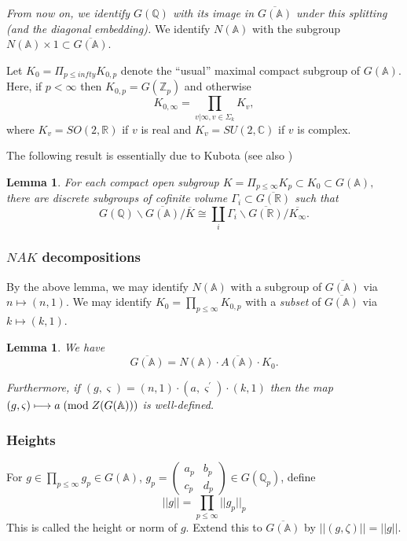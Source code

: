 \documentclass[12pt]{article}
\numberwithin{equation}{section}
\newtheorem{lemma}[theorem]{Lemma}
\def\aaa{\mathbb{A}}
\def\qqq{\mathbb{Q}}
\def\ccc{\mathbb{C}}
\begin{document}
{\em From now on, we identify $G(\qqq)$ with its image
in $\overline{G(\aaa )}$ under this splitting (and the diagonal
embedding).} We identify $N(\aaa )$ with the
subgroup
$N(\aaa )\times 1\subset \overline{G(\aaa )}$.

Let $K_0=\Pi_{p\leq infty}K_{0,p}$
denote the ``usual'' maximal compact subgroup of $G(\aaa )$.
Here, if $p<\infty $ then $K_{0,p}=G({\mathbb Z}_p)$ and
otherwise
\[
K_{0,\infty}=\prod_{ v|\infty, v\in\Sigma_k}K_v, 
\]
where $K_v=SO(2,{\mathbb{R}})$ if $v$ is real and
$K_v=SU(2,\ccc )$ if $v$ is complex.

The following result is essentially due to Kubota \cite[Proposition 5]{K2} (see also \cite[Lemma 3.2]{Ge2})

\begin{lemma}\label{lem:2.7}
For each compact open subgroup $K=\Pi _{p\leq \infty }K_p\subset K_0\subset
G(\aaa ),$ there are discrete subgroups of cofinite volume $\Gamma
_i\subset \overline{G({\mathbb{R}})}$ such that 
\[
G({\mathbb Q})\backslash \overline{G(\aaa )}/\overline{K}
\cong \coprod_i
\Gamma _i\backslash \overline{G({\mathbb{R}})}/\overline{K_\infty }.
\]
\end{lemma}

\subsubsection{$NAK$ decompositions}

By the above lemma, we may identify $N(\aaa )$ with a subgroup of $%
\overline{G(\aaa )}$ via $n\longmapsto (n,1)$. We may identify $%
K_0=\prod_{p\leq \infty }K_{0,p}$ with a {\em subset} of
$\overline{G(\aaa )}$ via $k\longmapsto (k,1)$.

\begin{lemma}\label{lem:2.8}
We have 
\[
\overline{G(\aaa )}
=N(\aaa )\cdot \overline{A(\aaa )}\cdot K_0.
\]

Furthermore, if $(g,\varsigma )=(n,1)\cdot (a,\varsigma ^{\prime })\cdot
(k,1)$ then the map
$(g,\varsigma )\longmapsto a\;({\rm mod}\;Z(G(\aaa )))$
is well-defined.
\end{lemma}

\subsubsection{Heights}

For $g\in \prod_{p\leq \infty }g_p\in G(\aaa )$,
$g_p=\left( 
\begin{array}{cc}
a_p & b_p \\ 
c_p & d_p
\end{array}
\right) \in G(\qqq_p)$, define 
\begin{equation}\label{eq:2.10}
||g||=\prod_{p\leq \infty }||g_p||_p
\end{equation}
This is called the height or norm of $g$. Extend this to
$\overline{G(\aaa )}$ by $||(g,\zeta)||=||g||$.
\end{document}
